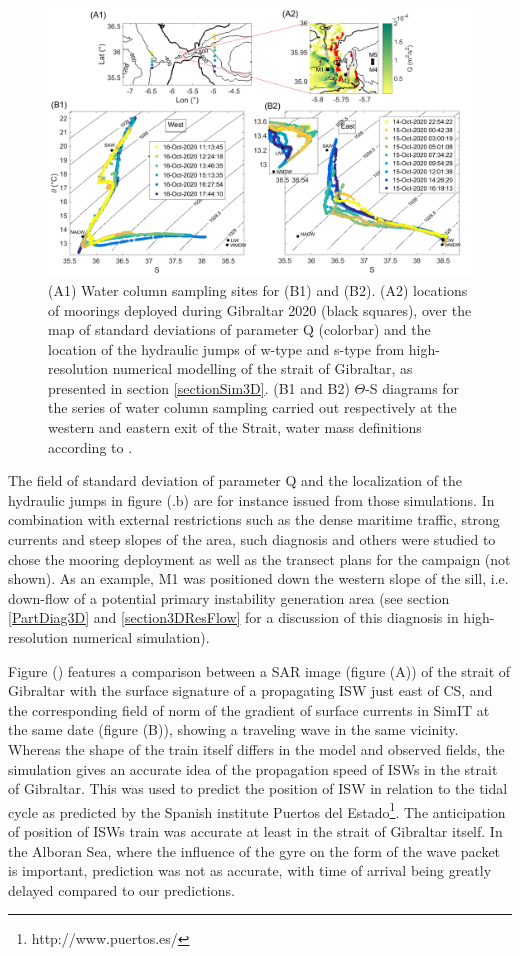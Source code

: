  
\begin{figure}[!h]
 \includegraphics[width=\textwidth]{./GBR3D/Fig_Moor.png}
 \caption {(A1) Water column sampling sites for (B1) and (B2). (A2) locations of moorings deployed during Gibraltar 2020 (black squares), over the map of standard deviations of parameter Q (colorbar) and the location of the hydraulic jumps of w-type and s-type from high-resolution numerical modelling of the strait of Gibraltar, as presented in section \ref{sectionSim3D}. (B1 and B2) $\Theta$-S diagrams for the series of water column sampling carried out respectively at the western and eastern exit of the Strait, water mass definitions according to \citet{Naranjo2015}.}
 \label{fig_moor}
\end{figure}

The field of standard deviation of parameter Q and the localization of the hydraulic jumps in figure (.b) are for instance issued from those simulations. In combination with external restrictions such as the dense maritime traffic, strong currents and steep slopes of the area, such diagnosis and others were studied to chose the mooring deployment as well as the transect plans for the campaign (not shown). As an example, M1 was positioned down the western slope of the sill, i.e. down-flow of a potential primary instability generation area (see section \ref{PartDiag3D} and \ref{section3DResFlow} for a discussion of this diagnosis in high-resolution numerical simulation).

Figure () features a comparison between a SAR image (figure (A)) of the strait of Gibraltar with the surface signature of a propagating ISW just east of CS, and the corresponding field of norm of the gradient of surface currents in SimIT at the same date (figure (B)), showing a traveling wave in the same vicinity. Whereas the shape of the train itself differs in the model and observed fields, the simulation gives an accurate idea of the propagation speed of ISWs in the strait of Gibraltar. This was used to predict the position of ISW in relation to the tidal cycle as predicted by the Spanish institute Puertos del Estado\footnote{http://www.puertos.es/}. The anticipation of position of ISWs train was accurate at least in the strait of Gibraltar itself. In the Alboran Sea, where the influence of the gyre on the form of the wave packet is important, prediction was not as accurate, with time of arrival being greatly delayed compared to our predictions. 

